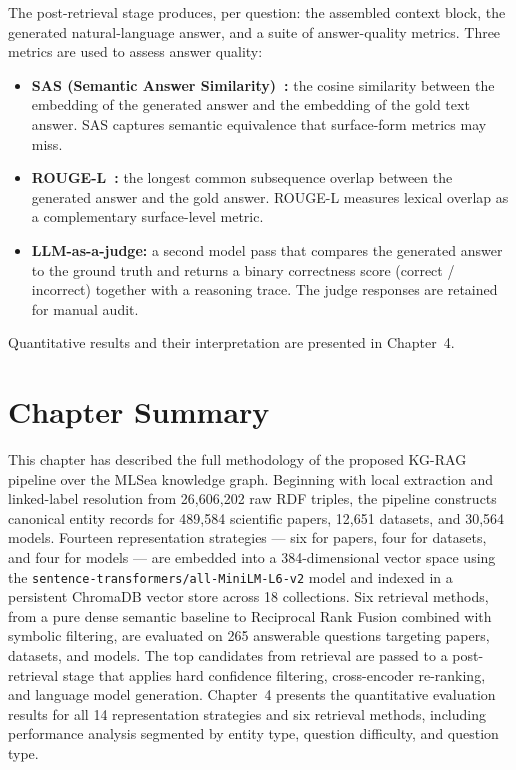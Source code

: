 The post-retrieval stage produces, per question: the assembled context block,
the generated natural-language answer, and a suite of answer-quality metrics.
Three metrics are used to assess answer quality:

\begin{itemize}
  \item \textbf{SAS (Semantic Answer Similarity)~:} the cosine
        similarity between the embedding of the generated answer and the
        embedding of the gold text answer.
        SAS captures semantic equivalence that surface-form metrics may miss.
  \item \textbf{ROUGE-L~:} the longest common subsequence
        overlap between the generated answer and the gold answer.
        ROUGE-L measures lexical overlap as a complementary surface-level metric.
  \item \textbf{LLM-as-a-judge:} a second model pass that compares the
        generated answer to the ground truth and returns a binary correctness
        score (correct / incorrect) together with a reasoning trace.
        The judge responses are retained for manual audit.
\end{itemize}

Quantitative results and their interpretation are presented in Chapter~4.

\section*{Chapter Summary}

This chapter has described the full methodology of the proposed KG-RAG
pipeline over the MLSea knowledge graph.
Beginning with local extraction and linked-label resolution from
26{,}606{,}202 raw RDF triples, the pipeline constructs canonical entity
records for 489{,}584 scientific papers, 12{,}651 datasets, and 30{,}564
models.
Fourteen representation strategies --- six for papers, four for datasets, and
four for models --- are embedded into a 384-dimensional vector space using the
\texttt{sentence-transformers/all-MiniLM-L6-v2} model and indexed in a
persistent ChromaDB vector store across 18 collections.
Six retrieval methods, from a pure dense semantic baseline to Reciprocal Rank
Fusion combined with symbolic filtering, are evaluated on 265 answerable
questions targeting papers, datasets, and models.
The top candidates from retrieval are passed to a post-retrieval stage that
applies hard confidence filtering, cross-encoder re-ranking, and language
model generation.
Chapter~4 presents the quantitative evaluation results for all 14
representation strategies and six retrieval methods, including performance
analysis segmented by entity type, question difficulty, and question type.
